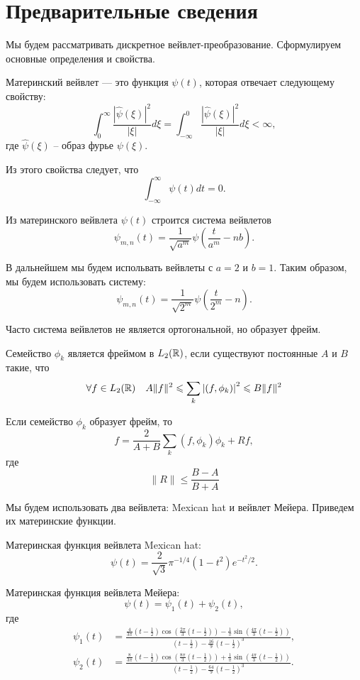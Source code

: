\documentclass[../paper.tex]{subfiles}
\begin{document}
\section{Предварительные сведения}
Мы будем рассматривать дискретное вейвлет-преобразование. Сформулируем основные определения и свойства.
\begin{Def}
Материнский вейвлет --- это функция $\psi(t)$, которая отвечает следующему свойству:
\[
	\int_0^\infty \frac{ \left|\hat{\psi}(\xi)\right|^2 }{\left|\xi\right|} d \xi
	= \int_{-\infty}^0 \frac{ \left|\hat{\psi}(\xi)\right|^2 }{\left|\xi\right|} d \xi
	< \infty
,\] где $\hat{\psi}(\xi)$ -- образ фурье $\psi(\xi)$.
\end{Def}

Из этого свойства следует, что
\[
	\int_{-\infty}^{\infty} \psi(t) dt = 0
.\]

Из материнского вейвлета $\psi(t)$ строится система вейвлетов
\[
	\psi_{m,n}(t) = \frac{1}{\sqrt{a^m}} \psi\left(\frac{t}{a^m} - n b\right)
.\]

В дальнейшем мы будем испольвать вейвлеты с $a=2$ и $b=1$.
Таким образом, мы будем использовать систему:
\[
	\psi_{m,n}(t) = \frac{1}{\sqrt{2^m}} \psi\left(\frac{t}{2^m} - n\right)
.\]

Часто система вейвлетов не является ортогональной, но образует фрейм.
\begin{Def}
Семейство $\phi_k$ является фреймом в $L_2(\mathbb{R})$, если существуют постоянные $A$ и $B$ такие, что
\[
\forall f \in L_2(\mathbb{R}) \quad A \|f\|^2 \leqslant \sum_k \left|\left(f, \phi_k\right)\right|^2 \leqslant B \|f\|^2
\]

\begin{Lem*}
Если семейство $\phi_k$ образует фрейм, то
\[
	f = \frac{2}{A+B} \sum_k \left(f, \phi_k\right)\phi_k + Rf
,\] где \[
	\|R\| \leqslant \frac{B-A}{B+A}
\]

Мы будем использовать два вейвлета: Mexican hat и вейвлет Мейера. Приведем их материнские функции.

\begin{Def}
Материнская функция вейвлета Mexican hat:
\[
	\psi(t) = \frac{2}{\sqrt{3}} \pi^{-1/4} \left(1-t^2\right) e^{-t^2/2}
.\]
\end{Def}
\begin{Def}
Материнская функция вейвлета Мейера:
\[
	\psi(t) = \psi_1(t) + \psi_2(t)
,\] где
\begin{align*}
	\psi_1(t) &=
		\frac{
			\frac{4}{3\pi}\left(t-\frac{1}{2}\right) \cos\left(\frac{2\pi}{3}\left(t-\frac{1}{2}\right)\right) 
			- \frac{1}{\pi} \sin \left(\frac{4\pi}{3}\left(t-\frac{1}{2}\right)\right)
		}{
			\left(t-\frac{1}{2}\right) - \frac{16}{9} \left(t - \frac{1}{2}\right)^3
		}, \\
	\psi_2(t) &=
		\frac{
			\frac{8}{3\pi}\left(t-\frac{1}{2}\right) \cos\left(\frac{8\pi}{3}\left(t-\frac{1}{2}\right)\right) 
			+ \frac{1}{\pi} \sin \left(\frac{4\pi}{3}\left(t-\frac{1}{2}\right)\right)
		}{
			\left(t-\frac{1}{2}\right) - \frac{64}{9} \left(t - \frac{1}{2}\right)^3
		}.
\end{align*}
\end{Def}
\end{Lem*}
\end{Def}
\end{document}
